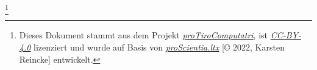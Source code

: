 
\footnote{Dieses Dokument stammt aus dem Projekt
\textit{\href{https://github.com/kreincke/proTiroComputatri}{proTiroComputatri}},
ist \textit{\href{https://creativecommons.org/licenses/by/4.0/}{CC-BY-4.0}} lizenziert 
und wurde auf Basis von \textit{\href{https://github.com/kreincke/proScientia.ltx}{proScientia.ltx}} 
[\copyright{} 2022, Karsten Reincke] entwickelt.}
